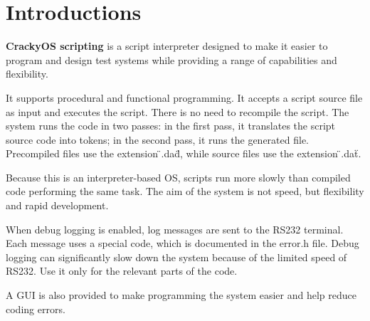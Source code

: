 \chapter{Introductions}
\hypertarget{00_introductions}{}\label{00_introductions}
{\bfseries{Cracky\+OS scripting}} is a script interpreter designed to make it easier to program and design test systems while providing a range of capabilities and flexibility.

It supports procedural and functional programming. It accepts a script source file as input and executes the script. There is no need to recompile the script. The system runs the code in two passes\+: in the first pass, it translates the script source code into tokens; in the second pass, it runs the generated file. Precompiled files use the extension \"{}.\+dad\"{}, while source files use the extension \"{}.\+dat\"{}.

Because this is an interpreter-\/based OS, scripts run more slowly than compiled code performing the same task. The aim of the system is not speed, but flexibility and rapid development.

When debug logging is enabled, log messages are sent to the RS232 terminal. Each message uses a special code, which is documented in the error.\+h file. Debug logging can significantly slow down the system because of the limited speed of RS232. Use it only for the relevant parts of the code.

A GUI is also provided to make programming the system easier and help reduce coding errors. 